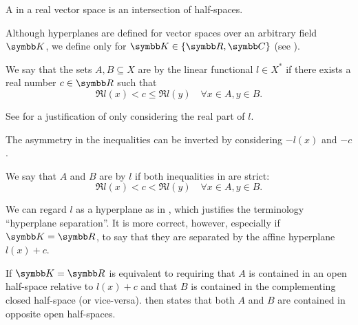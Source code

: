 \begin{definition}\label{def:polyhedron}
  A  in a real vector space is an intersection of half-spaces.
\end{definition}

\begin{definition}\label{def:hyperplane_separation}
  Although hyperplanes are defined for vector spaces over an arbitrary field \( \BK \), we define  only for \( \BK \in \{ \BR, \BC \} \) (see ).

  We say that the sets \( A, B \subseteq X \) are  by the linear functional \( l \in X^* \) if there exists a real number \( c \in \BR \) such that
  \begin{equation}\label{def:hyperplane_separation/normal}
    \Re l(x) < c \leq \Re l(y) \quad\forall x \in A, y \in B.
  \end{equation}

  See  for a justification of only considering the real part of \( l \).

  The asymmetry in the inequalities  can be inverted by considering \( -l(x) \) and \( -c \).

  We say that \( A \) and \( B \) are  by \( l \) if both inequalities in  are strict:
  \begin{equation}\label{def:hyperplane_separation/strong}
    \Re l(x) < c < \Re l(y) \quad\forall x \in A, y \in B.
  \end{equation}

  We can regard \( l \) as a hyperplane as in , which justifies the terminology \enquote{hyperplane separation}. It is more correct, however, especially if \( \BK = \BR \), to say that they are separated by the affine hyperplane \( l(x) + c \).

  If \( \BK = \BR \)  is equivalent to requiring that \( A \) is contained in an open half-space relative to \( l(x) + c \) and that \( B \) is contained in the complementing closed half-space (or vice-versa).  then states that both \( A \) and \( B \) are contained in opposite open half-spaces.
\end{definition}


